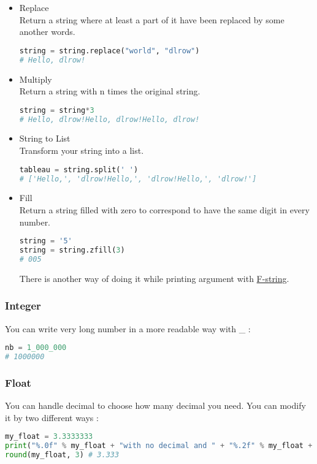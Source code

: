 \documentclass[a4paper, 12pt, titlepage]{scrartcl} %
\begin{document}
\begin{itemize}
\item Replace \\
Return a string where at least a part of it have been replaced by some another words.
\begin{lstlisting}[language=Python]
string = string.replace("world", "dlrow")
# Hello, dlrow!
\end{lstlisting} \vspace{5mm}

\item Multiply \\
Return a string with n times the original string.
\begin{lstlisting}[language=Python]
string = string*3
# Hello, dlrow!Hello, dlrow!Hello, dlrow!
\end{lstlisting} \vspace{5mm}

\item String to List \\
Transform your string into a list.
\begin{lstlisting}[language=Python]
tableau = string.split(' ')
# ['Hello,', 'dlrow!Hello,', 'dlrow!Hello,', 'dlrow!']
\end{lstlisting} \vspace{5mm}

\item Fill \\
Return a string filled with zero to correspond to have the same digit in every number.
\begin{lstlisting}[language=Python]
string = '5'
string = string.zfill(3)
# 005
\end{lstlisting} \vspace{5mm}

There is another way of doing it while printing argument with \hyperref[subsec:F-string]{F-string}.
\end{itemize}

\subsubsection{Integer}
You can write very long number in a more readable way with \_ : 
\begin{lstlisting}[language=Python]
nb = 1_000_000
# 1000000
\end{lstlisting} \vspace{5mm}

\subsubsection{Float}
You can handle decimal to choose how many decimal you need. You can modify it by two different ways : 
\begin{lstlisting}[language=Python]
my_float = 3.3333333
print("%.0f" % my_float + "with no decimal and " + "%.2f" % my_float + "with two decimals") #3 with no decimal and 3.33 with two decimals
round(my_float, 3) # 3.333
\end{lstlisting} \vspace{5mm}
\end{document}
